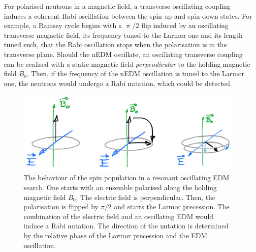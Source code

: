 
For polarised neutrons in a magnetic field, a transverse oscillating coupling induces a coherent Rabi oscillation between the spin-up and spin-down states.
For example, a Ramsey cycle begins with a $\uppi/2$ flip induced by an oscillating transverse magnetic field, its frequency tuned to the Larmor one and its length tuned such, that the Rabi oscillation stops when the polarisation is in the transverse plane. Should the nEDM oscillate, an oscillating transverse coupling can be realised with a static magnetic field \emph{perpendicular} to the holding magnetic field $B_0$. Then, if the frequency of the nEDM oscillation is tuned to the Larmor one, the neutrons would undergo a Rabi nutation, which could be detected.

\begin{figure}
  \centering
  \includegraphics[width=\linewidth]{gfx/axions/resonant_effect.png}
  \caption{The behaviour of the spin population in a resonant oscillating EDM search. One starts with an ensemble polarised along the holding magnetic field $B_0$. The electric field is perpendicular. Then, the polarisation is flipped by $\pi$/2 and starts the Larmor precession. The combination of the electric field and an oscillating EDM would induce a Rabi nutation. The direction of the nutation is determined by the relative phase of the Larmor precession and the EDM oscillation.}\label{fig:axions_resonant_effect}
\end{figure}

